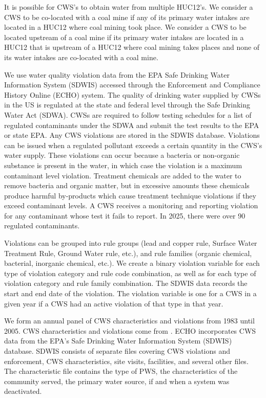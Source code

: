 \documentclass{article}
\begin{document}
It is possible for CWS's to obtain water from multiple HUC12's. We consider a CWS to be co-located with a coal mine if any of its primary water intakes are located in a HUC12 where coal mining took place. We consider a CWS to be located upstream of a coal mine if its primary water intakes are located in a HUC12 that is upstream of a HUC12 where coal mining takes places and none of its water intakes are co-located with a coal mine.

We use water quality violation data from the EPA Safe Drinking Water Information System (SDWIS) accessed through the Enforcement and Compliance History Online (ECHO) system. The quality of drinking water supplied by CWSs in the US is regulated at the state and federal level through the Safe Drinking Water Act (SDWA). CWSs are required to follow testing schedules for a list of regulated contaminants under the SDWA and submit the test results to the EPA or state EPA. Any CWS violations are stored in the SDWIS database. Violations can be issued when a regulated pollutant exceeds a certain quantity in the CWS's water supply. These violations can occur because a bacteria or non-organic substance is present in the water, in which case the violation is a maximum contaminant level violation. Treatment chemicals are added to the water to remove bacteria and organic matter, but in excessive amounts these chemicals produce harmful by-products which cause treatment technique violations if they exceed contaminant levels. A CWS receives a monitoring and reporting violation for any contaminant whose test it fails to report. In 2025, there were over 90 regulated contaminants.

Violations can be grouped into rule groups (lead and copper rule, Surface Water Treatment Rule, Ground Water rule, etc.), and rule families (organic chemical, bacterial, inorganic chemical, etc.). We create a binary violation variable for each type of violation category and rule code combination, as well as for each type of violation category and rule family combination. The SDWIS data records the start and end date of the violation. The violation variable is one for a CWS in a given year if a CWS had an active violation of that type in that year. 

We form an annual panel of CWS characteristics and violations from 1983 until 2005. CWS characteristics and violations come from . ECHO incorporates CWS data from the EPA's Safe Drinking Water Information System (SDWIS) database. SDWIS consists of separate files covering CWS violations and enforcement, CWS characteristics, site visits, facilities, and several other files. The characteristic file contains the type of PWS, the characteristics of the community served, the primary water source, if and when a system was deactivated.
\end{document}
